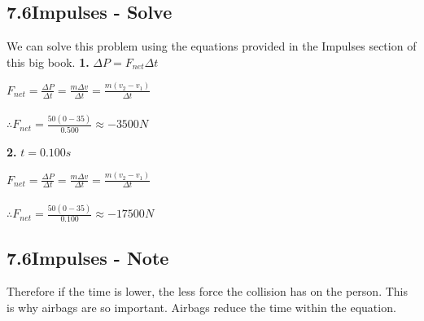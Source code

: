 \subsection*{7.6\hspace*{0.5cm}Impulses - Solve}
We can solve this problem using the equations provided in the Impulses section of this big book.\newline\newline
\textbf{1.} $\Delta P = F_{net}\Delta t$ \\
\begin{adjustwidth}{0.6cm}{0pt}
    $F_{net} = \frac{\Delta P}{\Delta t} = \frac{m\Delta v}{\Delta t} = \frac{m(v_{2} - v_{1})}{\Delta t}$ \\\\
    $\therefore F_{net} = \frac{50(0 - 35)}{0.500} \approx -3500N$
\end{adjustwidth}\vspace*{15pt}
\textbf{2.} $t = 0.100s$ \\
\begin{adjustwidth}{0.6cm}{0pt}
    $F_{net} = \frac{\Delta P}{\Delta t} = \frac{m\Delta v}{\Delta t} = \frac{m(v_{2} - v_{1})}{\Delta t}$ \\\\
    $\therefore F_{net} = \frac{50(0 - 35)}{0.100} \approx -17500N$
\end{adjustwidth}\vspace*{15pt}
\subsection*{7.6\hspace*{0.5cm}Impulses - Note}
Therefore if the time is lower, the less force the collision has on the person. This is why airbags are so important. Airbags reduce the time within the equation.
